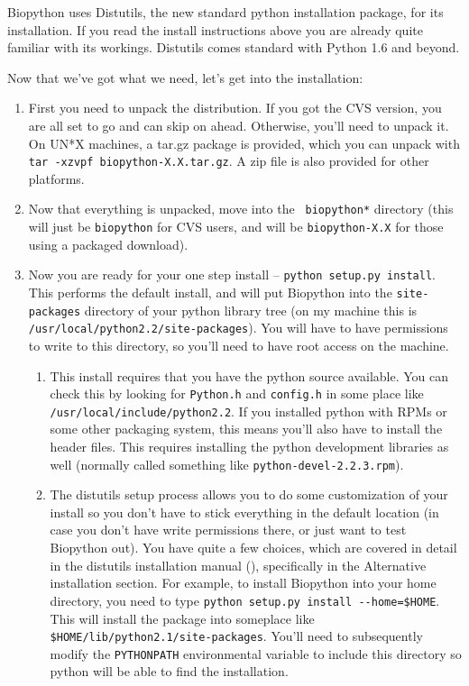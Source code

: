 \documentclass{article}
\begin{document}
Biopython uses Distutils, the new standard python installation package, for
its installation. If you read the install instructions above you are
already quite familiar with its workings. Distutils comes standard with 
Python 1.6 and beyond.

Now that we've got what we need, let's get into the installation:

\begin{enumerate}

\item First you need to unpack the distribution. If you got the CVS version, you are all set to go and can skip on ahead. Otherwise, you'll need to unpack it. On UN*X machines, a tar.gz package is provided, which you can unpack with \verb|tar -xzvpf biopython-X.X.tar.gz|. A zip file is also provided for other platforms.

\item Now that everything is unpacked, move into the \verb| biopython*| directory (this will just be \verb|biopython| for CVS users, and will be \verb|biopython-X.X| for those using a packaged download). 

\item Now you are ready for your one step install -- \verb|python setup.py install|. This performs the default install, and will put Biopython into the \verb|site-packages| directory of your python library tree (on my machine this is \verb|/usr/local/python2.2/site-packages|). You will have to have permissions to write to this directory, so you'll need to have root access on the machine.

\begin{enumerate}

\item This install requires that you have the python source available. You can check this by looking for \verb|Python.h| and \verb|config.h| in some place like \verb|/usr/local/include/python2.2|. If you installed python with RPMs or 
some other packaging system, this means you'll also have to install the
header files. This requires installing the python development libraries
as well (normally called something like \verb|python-devel-2.2.3.rpm|).

\item The distutils setup process allows you to do some customization of your install so you don't have to stick everything in the default location (in case you don't have write permissions there, or just want to test Biopython out). You have quite a few choices, which are covered in detail in the distutils installation manual (), specifically in the Alternative installation section. For example, to install Biopython into your home directory, you need to type \verb|python setup.py install --home=$HOME|. This will install the package into someplace like \verb|$HOME/lib/python2.1/site-packages|. You'll need to subsequently modify the \verb|PYTHONPATH| environmental variable to include this directory so python will be able to find the installation.


\end{enumerate}
\end{enumerate}
\end{document}
